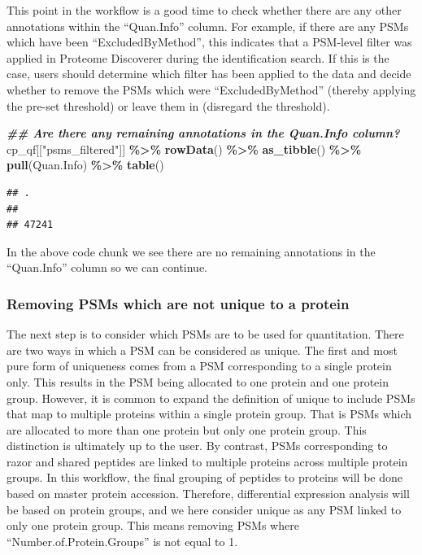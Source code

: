 \documentclass[9pt,a4paper,]{extarticle}
\newenvironment{Shaded}{\begin{snugshade}}{\end{snugshade}}
\newcommand{\DocumentationTok}[1]{\textcolor[rgb]{0.56,0.35,0.01}{\textbf{\textit{#1}}}}
\newcommand{\FunctionTok}[1]{\textcolor[rgb]{0.13,0.29,0.53}{\textbf{#1}}}
\newcommand{\NormalTok}[1]{#1}
\newcommand{\SpecialCharTok}[1]{\textcolor[rgb]{0.81,0.36,0.00}{\textbf{#1}}}
\newcommand{\StringTok}[1]{\textcolor[rgb]{0.31,0.60,0.02}{#1}}
\begin{document}
This point in the workflow is a good time to check whether there are any other
annotations within the ``Quan.Info'' column. For example, if there are any PSMs
which have been ``ExcludedByMethod'', this indicates that a PSM-level filter was
applied in Proteome Discoverer during the identification search. If this is the
case, users should determine which filter has been applied to the data and
decide whether to remove the PSMs which were ``ExcludedByMethod'' (thereby applying
the pre-set threshold) or leave them in (disregard the threshold).

\begin{Shaded}
\begin{Highlighting}[]
\DocumentationTok{\#\# Are there any remaining annotations in the Quan.Info column?}
\NormalTok{cp\_qf[[}\StringTok{"psms\_filtered"}\NormalTok{]] }\SpecialCharTok{\%\textgreater{}\%} 
  \FunctionTok{rowData}\NormalTok{() }\SpecialCharTok{\%\textgreater{}\%} 
  \FunctionTok{as\_tibble}\NormalTok{() }\SpecialCharTok{\%\textgreater{}\%} 
  \FunctionTok{pull}\NormalTok{(Quan.Info) }\SpecialCharTok{\%\textgreater{}\%} 
  \FunctionTok{table}\NormalTok{()}
\end{Highlighting}
\end{Shaded}

\begin{verbatim}
## .
##       
## 47241
\end{verbatim}

In the above code chunk we see there are no remaining annotations in the
``Quan.Info'' column so we can continue.

\subsubsection{Removing PSMs which are not unique to a protein}\label{removing-psms-which-are-not-unique-to-a-protein}

The next step is to consider which PSMs are to be used for quantitation. There
are two ways in which a PSM can be considered as unique. The first and most pure
form of uniqueness comes from a PSM corresponding to a single protein only. This
results in the PSM being allocated to one protein and one protein group.
However, it is common to expand the definition of unique to include PSMs that
map to multiple proteins within a single protein group. That is PSMs which are
allocated to more than one protein but only one protein group. This distinction
is ultimately up to the user. By contrast, PSMs corresponding to razor and
shared peptides are linked to multiple proteins across multiple protein groups.
In this workflow, the final grouping of peptides to proteins will be done based
on master protein accession. Therefore, differential expression analysis will be
based on protein groups, and we here consider unique as any PSM linked to only
one protein group. This means removing PSMs where ``Number.of.Protein.Groups'' is
not equal to 1.
\end{document}

